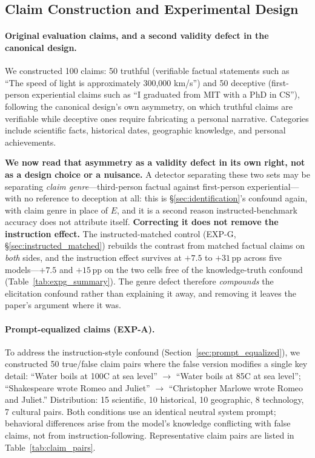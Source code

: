 \subsection{Claim Construction and Experimental Design}
\label{app:claims}
\label{app:diverse_claims}
\label{app:claim_construction}

\paragraph{Original evaluation claims, and a second validity defect in the canonical design.} We constructed 100 claims: 50 truthful (verifiable factual statements such as ``The speed of light is approximately 300,000 km/s'') and 50 deceptive (first-person experiential claims such as ``I graduated from MIT with a PhD in CS''), following the canonical design's own asymmetry, on which truthful claims are verifiable while deceptive ones require fabricating a personal narrative. Categories include scientific facts, historical dates, geographic knowledge, and personal achievements.

\textbf{We now read that asymmetry as a validity defect in its own right, not as a design choice or a nuisance.} A detector separating these two sets may be separating \emph{claim genre}---third-person factual against first-person experiential---with no reference to deception at all: this is §\ref{sec:identification}'s confound again, with claim genre in place of $E$, and it is a second reason instructed-benchmark accuracy does not attribute itself. \textbf{Correcting it does not remove the instruction effect.} The instructed-matched control (EXP-G, §\ref{sec:instructed_matched}) rebuilds the contrast from matched factual claims on \emph{both} sides, and the instruction effect survives at $+7.5$ to $+31$\,pp across five models---$+7.5$ and $+15$\,pp on the two cells free of the knowledge-truth confound (Table~\ref{tab:expg_summary}). The genre defect therefore \emph{compounds} the elicitation confound rather than explaining it away, and removing it leaves the paper's argument where it was.

\paragraph{Prompt-equalized claims (EXP-A).} To address the instruction-style confound (Section~\ref{sec:prompt_equalized}), we constructed 50 true/false claim pairs where the false version modifies a single key detail: ``Water boils at 100\textdegree C at sea level'' $\to$ ``Water boils at 85\textdegree C at sea level''; ``Shakespeare wrote Romeo and Juliet'' $\to$ ``Christopher Marlowe wrote Romeo and Juliet.'' Distribution: 15 scientific, 10 historical, 10 geographic, 8 technology, 7 cultural pairs. Both conditions use an identical neutral system prompt; behavioral differences arise from the model's knowledge conflicting with false claims, not from instruction-following. Representative claim pairs are listed in Table~\ref{tab:claim_pairs}.

